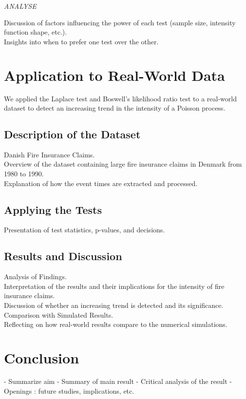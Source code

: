 \documentclass{journalstyle}
\begin{document}
\textit{ANALYSE}


Discussion of factors influencing the power of each test (sample size, intensity function shape, etc.). \\

Insights into when to prefer one test over the other.





\section{Application to Real-World Data}

We applied the Laplace test and Boswell's likelihood ratio test to a real-world dataset to detect an increasing trend in the intensity of a Poisson process.

\subsection{Description of the Dataset}
Danish Fire Insurance Claims. \\
Overview of the dataset containing large fire insurance claims in Denmark from 1980 to 1990. \\
Explanation of how the event times are extracted and processed.

\subsection{Applying the Tests}
Presentation of test statistics, p-values, and decisions. \\

\subsection{Results and Discussion}
Analysis of Findings. \\
Interpretation of the results and their implications for the intensity of fire insurance claims. \\
Discussion of whether an increasing trend is detected and its significance. \\
Comparison with Simulated Results. \\
Reflecting on how real-world results compare to the numerical simulations.



\section{Conclusion}
- Summarize aim
- Summary of main result
- Critical analysis of the result
- Openings : future studies, implications, etc.



\printbibliography
\end{document}
